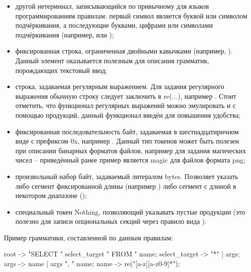 \begin{itemize}
	\item другой нетерминал, записывающийся по привычному для языков программированиям правилам: первый символ является буквой или символом подчёркивания, а последующие буквами, цифрами или символами подчёркивания (например,  или );
	
	\item фиксированная строка, ограниченная двойными кавычками (например, ). Данный элемент оказывается полезным для описания грамматик, порождающих текстовый ввод;
	
	\item строка, задаваемая регулярным выражением. Для задания регулярного выражения обычную строку следует заключить в re(...), например . Стоит отметить, что функционал регулярных выражений можно эмулировать и с помощью продукций, данный функционал введён для повышения удобства;
	
	\item фиксированная последовательность байт, задаваемая в шестнадцатиричном виде с префиксом 0x, например . Данный тип токенов может быть полезен при описании бинарных форматов файлов, например для задания магических чисел -- приведённый ранее пример является magic для файлов формата png;
	
	\item произвольный набор байт, задаваемый литералом bytes. Позволяет указать либо сегмент фиксированной длины (например ) либо сегмент с длиной в некотором диапазоне ();
	
	\item специальный токен Nothing, позволяющий указывать пустые продукции (это полезно для записи опциональных секций через правило вида ).
\end{itemize}

Пример грамматики, составленной по данным правилам:
\begin{code}
root -> "SELECT " select_target " FROM " name;
select_target -> "*" | args;
args -> name | args ", " name;
name -> re("[a-z][a-z0-9]*");
\end{code}